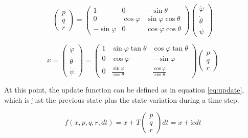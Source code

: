 \begin{equation}
    \label{eq:euler_transf}
    \begin{pmatrix}
        p \\
        q \\
        r
    \end{pmatrix}
    = \begin{pmatrix}
        1 & 0 & -\sin \theta \\
        0 & \cos \varphi & \sin \varphi \cos \theta \\
        -\sin \varphi & 0 & \cos \varphi \cos \theta
    \end{pmatrix}
    \begin{pmatrix}
        \dot{\varphi} \\
        \dot{\theta} \\
        \dot{\psi}
    \end{pmatrix}
\end{equation} 

\begin{equation}
    \label{eq:T}
    \dot{x} =
    \begin{pmatrix}
        \dot{\varphi} \\
        \dot{\theta} \\
        \dot{\psi}
    \end{pmatrix}
    = \begin{pmatrix}
        1 & \sin \varphi \tan \theta & \cos \varphi \tan \theta \\
        0 & \cos \varphi & - \sin \varphi \\
        0 & \frac{\sin \varphi}{\cos \theta}  & \frac{\cos \varphi}{\cos \theta}
    \end{pmatrix}
    \begin{pmatrix}
        p \\
        q \\
        r
    \end{pmatrix}
\end{equation} 

At this point, the update function can be defined as in equation \ref{eq:update}, which is just the previous state plus the state variation during a time step.

\begin{equation}
\label{eq:update}
f(x,p,q,r,dt) = x + T
\begin{pmatrix}
p \\ q \\ r
\end{pmatrix}
dt = x + \dot{x} dt
\end{equation}

